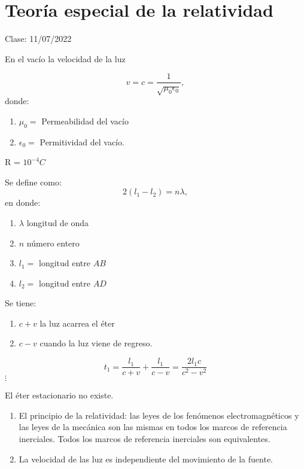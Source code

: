 
\section{Teoría especial de la relatividad}

Clase: 11/07/2022

\begin{definicion} En el vacío la velocidad de la luz 

    $$v=c=\frac{1}{\sqrt{\mu_0 \epsilon_0}},$$
    donde: 
    \begin{enumerate}
        \item $\mu_0=$ Permeabilidad del vacío 
        \item $\epsilon_0=$ Permitividad del vacío.
    \end{enumerate}
    
\end{definicion}

\begin{definicion}
    R = $10^{-4}C$
\end{definicion}

\begin{definicion}
    Se define como: 
    $$2(l_1-l_2)=n\lambda,$$
    en donde: 
    \begin{enumerate}
        \item $\lambda$ longitud de onda
        \item $n$ número entero
        \item $l_1=$ longitud entre $AB$
        \item $l_2=$ longitud entre $AD$
    \end{enumerate}
\end{definicion}


\begin{definicion}
    Se tiene:
    \begin{enumerate}
        \item $c+v$ la luz acarrea el éter
        \item $c-v$ cuando la luz viene de regreso.
    \end{enumerate}
    $$t_1=\frac{l_1}{c+v}+\frac{l_1}{c-v}=\frac{2l_1c}{c^2-v^2}$$
    $\vdots$

    El éter estacionario no existe. 

\end{definicion}

\begin{definicion}
    \begin{enumerate}
        \item El principio de la relatividad: las leyes de los fenómenos electromagnéticos y las leyes de la mecánica son las mismas en todos los marcos de referencia inerciales. Todos los marcos de referencia inerciales son equivalentes.
        \item La velocidad de las luz es independiente del movimiento de la fuente. 
    \end{enumerate}
\end{definicion}


